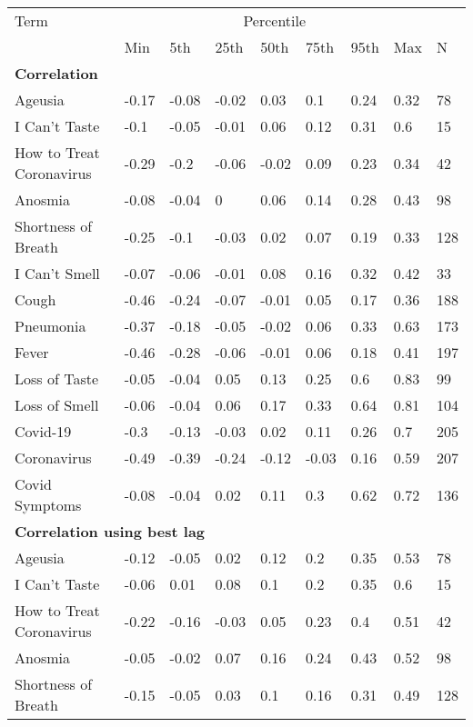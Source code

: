 \begin{tabular}{l llllllll} 
\hline 
Term & & \multicolumn{5}{c}{Percentile} &  &  \\ 
 & Min & 5th & 25th & 50th & 75th & 95th & Max & N \\ 
\hline 
\multicolumn{9}{l}{{\bf Correlation}} \\ 
Ageusia & -0.17 & -0.08 & -0.02 & 0.03 & 0.1 & 0.24 & 0.32 & 78  \\ 
I Can't Taste & -0.1 & -0.05 & -0.01 & 0.06 & 0.12 & 0.31 & 0.6 & 15  \\ 
How to Treat Coronavirus & -0.29 & -0.2 & -0.06 & -0.02 & 0.09 & 0.23 & 0.34 & 42  \\ 
Anosmia & -0.08 & -0.04 & 0 & 0.06 & 0.14 & 0.28 & 0.43 & 98  \\ 
Shortness of Breath & -0.25 & -0.1 & -0.03 & 0.02 & 0.07 & 0.19 & 0.33 & 128  \\ 
I Can't Smell & -0.07 & -0.06 & -0.01 & 0.08 & 0.16 & 0.32 & 0.42 & 33  \\ 
Cough & -0.46 & -0.24 & -0.07 & -0.01 & 0.05 & 0.17 & 0.36 & 188  \\ 
Pneumonia & -0.37 & -0.18 & -0.05 & -0.02 & 0.06 & 0.33 & 0.63 & 173  \\ 
Fever & -0.46 & -0.28 & -0.06 & -0.01 & 0.06 & 0.18 & 0.41 & 197  \\ 
Loss of Taste & -0.05 & -0.04 & 0.05 & 0.13 & 0.25 & 0.6 & 0.83 & 99  \\ 
Loss of Smell & -0.06 & -0.04 & 0.06 & 0.17 & 0.33 & 0.64 & 0.81 & 104  \\ 
Covid-19 & -0.3 & -0.13 & -0.03 & 0.02 & 0.11 & 0.26 & 0.7 & 205  \\ 
Coronavirus & -0.49 & -0.39 & -0.24 & -0.12 & -0.03 & 0.16 & 0.59 & 207  \\ 
Covid Symptoms & -0.08 & -0.04 & 0.02 & 0.11 & 0.3 & 0.62 & 0.72 & 136  \\ 
\hline 
\multicolumn{9}{l}{{\bf Correlation using best lag}} \\ 
Ageusia & -0.12 & -0.05 & 0.02 & 0.12 & 0.2 & 0.35 & 0.53 & 78  \\ 
I Can't Taste & -0.06 & 0.01 & 0.08 & 0.1 & 0.2 & 0.35 & 0.6 & 15  \\ 
How to Treat Coronavirus & -0.22 & -0.16 & -0.03 & 0.05 & 0.23 & 0.4 & 0.51 & 42  \\ 
Anosmia & -0.05 & -0.02 & 0.07 & 0.16 & 0.24 & 0.43 & 0.52 & 98  \\ 
Shortness of Breath & -0.15 & -0.05 & 0.03 & 0.1 & 0.16 & 0.31 & 0.49 & 128  \\ 

\end{tabular}
